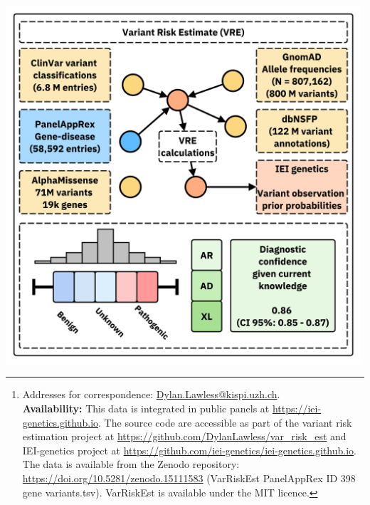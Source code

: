 \begin{abstract}
\noindent  \textbf{Conclusions}:
Our method addresses a long-standing gap in clinical genomics by quantifying both observed and unobserved genetic evidence in disease diagnosis. Although demonstrated in IEI, it is broadly applicable and provides a quantitative basis for variant interpretation, clinical decision-making, and future genomic analyses.
\footnote{
\noindent * Addresses for correspondence: \href{mailto:Dylan.Lawless@kispi.uzh.ch}{Dylan.Lawless@kispi.uzh.ch}.\\
\textbf{Availability:} This data is integrated in public panels at 
\url{https://iei-genetics.github.io}.
The source code are accessible as part of the variant risk estimation project at \url{https://github.com/DylanLawless/var_risk_est} and IEI-genetics project at
\url{https://github.com/iei-genetics/iei-genetics.github.io}.
The data is available from the Zenodo repository: 
\url{https://doi.org/10.5281/zenodo.15111583}
(VarRiskEst PanelAppRex ID 398 gene variants.tsv).
VarRiskEst is available under the MIT licence.
}
\vfill
\end{abstract}


\noindent\includegraphics[width=0.99\textwidth]{../images/var_risk_est_ci.pdf}

